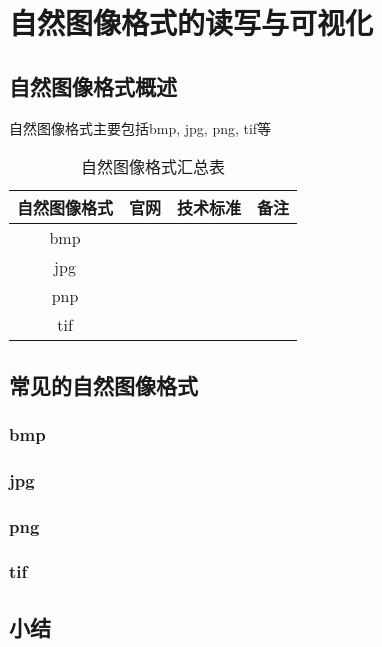 

\chapter{自然图像格式的读写与可视化}
\section{自然图像格式概述}
自然图像格式主要包括bmp, jpg, png, tif等
\begin{table}[t]
    \centering
    \begin{tabular}{c|c|c|c}
        \hline 
         自然图像格式 & 官网 & 技术标准 & 备注  \\
        \hline
         bmp & & & \\ 
         jpg & & & \\ 
         pnp & & & \\ 
         tif & & & \\ 
        \hline
    \end{tabular}
    \caption{自然图像格式汇总表}
    \label{tab:2-1}
\end{table}


\section{常见的自然图像格式}
\subsection{bmp}
\subsection{jpg}
\subsection{png}
\subsection{tif}
\section{小结}
